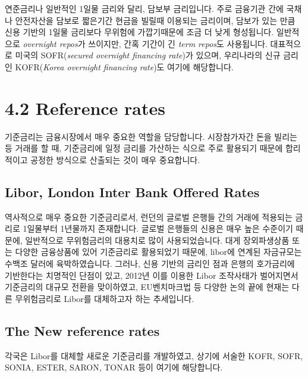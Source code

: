 \documentclass[
  letterpaper,
  DIV=11,
  numbers=noendperiod]{scrreprt}
\begin{document}
연준금리나 일반적인 1일물 금리와 달리, 담보부 금리입니다. 주로 금융기관
간에 국채나 안전자산을 담보로 짧은기간 현금을 빌릴때 이용되는 금리이며,
담보가 있는 만큼 신용 기반의 1일물 금리보다 무위험에 가깝기때문에 조금
더 낮게 형성됩니다. 일반적으로 \emph{overnight repos}가 쓰이지만, 간혹
기간이 긴 \emph{term repos}도 사용됩니다. 대표적으로 미국의
SOFR(\emph{secured overnight financing rate})가 있으며, 우리나라의 신규
금리인 KOFR(\emph{Korea overnight financing rate})도 여기에 해당합니다.

\section*{4.2 Reference rates}\label{reference-rates}


기준금리는 금융시장에서 매우 중요한 역할을 담당합니다. 시장참가자간 돈을
빌리는 등 거래를 할 때, 기준금리에 일정 금리를 가산하는 식으로 주로
활용되기 때문에 합리적이고 공정한 방식으로 산출되는 것이 매우
중요합니다.

\subsection*{Libor, London Inter Bank Offered
Rates}\label{libor-london-inter-bank-offered-rates}

역사적으로 매우 중요한 기준금리로서, 런던의 글로벌 은행들 간의 거래에
적용되는 금리로 1일물부터 1년물까지 존재합니다. 글로벌 은행들의 신용은
매우 높은 수준이기 때문에, 일반적으로 무위험금리의 대용치로 많이
사용되었습니다. 대게 장외파생상품 또는 다양한 금융상품에 있어 기준금리로
활용되었기 때문에, libor에 연계된 자금규모는 수백조 달러에
육박하였습니다. 그러나, 신용 기반의 금리인 점과 은행의 호가금리에
기반한다는 치명적인 단점이 있고, 2012년 이를 이용한 Libor 조작사태가
벌어지면서 기준금리의 대규모 전환을 맞이하였고, EU벤치마크법 등 다양한
논의 끝에 현재는 다른 무위험금리로 Libor를 대체하고자 하는 추세입니다.

\subsection*{The New reference rates}\label{the-new-reference-rates}

각국은 Libor를 대체할 새로운 기준금리를 개발하였고, 상기에 서술한 KOFR,
SOFR, SONIA, ESTER, SARON, TONAR 등이 여기에 해당합니다.
\end{document}
